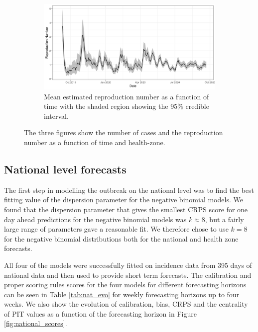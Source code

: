 \documentclass[12pt]{article}
\begin{document}
\begin{figure}[h!]
\bigskip

\begin{subfigure}{\textwidth}
  \centering
  \includegraphics[width=\textwidth]{../output/nat_Rs.png}
  \caption{Mean estimated reproduction number as a function of time with the shaded region showing the 95\% credible interval.}
  \label{fig:rep_num}
\end{subfigure}
\caption{The three figures show the number of cases and the reproduction number as a function of time and health-zone.}
\label{fig:nat_outbreak}
\end{figure}

\subsection{National level forecasts}
The first step in modelling the outbreak on the national level was to find the best fitting value of the dispersion parameter for the negative binomial models. We found that the dispersion parameter that gives the smallest CRPS score for one day ahead predictions for the negative binomial models was $k\approx8$, but a fairly large range of parameters gave a reasonable fit. We therefore chose to use $k=8$ for the negative binomial distributions both for the national and health zone forecasts.

All four of the models were successfully fitted on incidence data from 395 days of national data and then used to provide short term forecasts. The calibration and proper scoring rules scores for the four models for different forecasting horizons can be seen in Table \ref{tab:nat_evo} for weekly forecasting horizons up to four weeks. We also show the evolution of calibration, bias, CRPS and the centrality of PIT values as a function of the forecasting horizon in Figure \ref{fig:national_scores}.

\end{document}
